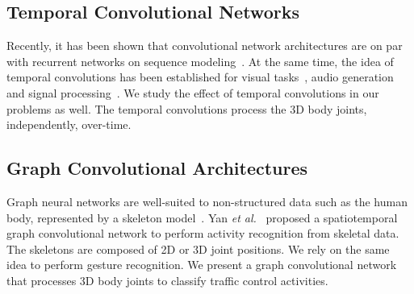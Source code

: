\documentclass[letterpaper, 10 pt, conference]{ieeeconf}
\begin{document}
\subsection{Temporal Convolutional Networks}

Recently, it has been shown that convolutional network architectures are on par with recurrent networks on sequence modeling~\cite{bai2018empirical}. At the same time, the idea of temporal convolutions has been established for visual tasks~\cite{Lea2017TemporalDetection}, audio generation~\cite{oord2016wavenet} and signal processing~\cite{casas2018adversarial}. We study the effect of temporal convolutions in our problems as well. The temporal convolutions process the 3D body joints, independently, over-time.

\subsection{Graph Convolutional Architectures}

Graph neural networks are well-suited to non-structured data such as the human body, represented by a skeleton model~\cite{Si2019AnRecognition}. Yan \textit{et al.}~\cite{Li2019SpatialRecognition} proposed a spatiotemporal graph convolutional network to perform activity recognition from skeletal data. The skeletons are composed of 2D or 3D joint positions. We rely on the same idea to perform gesture recognition. We present a graph convolutional network that processes 3D body joints to classify traffic control activities.
\end{document}
